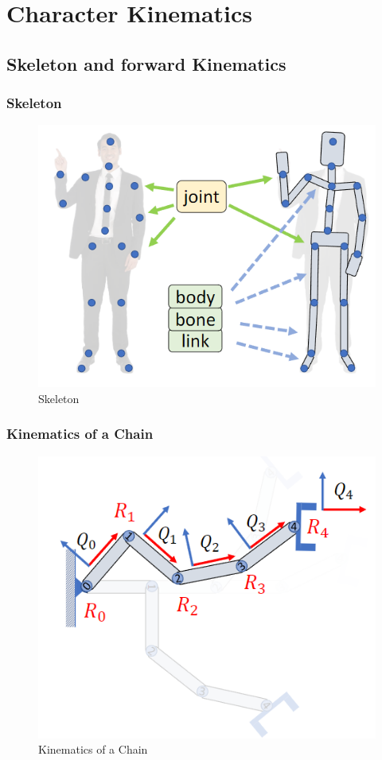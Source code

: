 \newpage
\section{Character Kinematics}
\subsection{Skeleton and forward Kinematics}

\subsubsection{Skeleton}

\begin{figure}[!htb]
    \centering
    \includegraphics[width=0.618\linewidth]{pic/1053/Skeleton}
    \caption{Skeleton}
\end{figure}


\subsubsection{Kinematics of a Chain}

\begin{figure}[!htb]
    \centering
    \includegraphics[width=0.618\linewidth]{pic/1053/Kinematics of a Chain}
    \caption{Kinematics of a Chain}
\end{figure}

